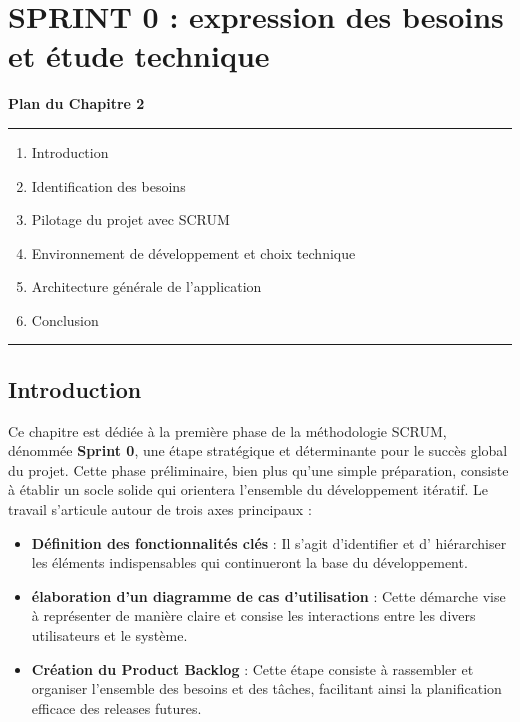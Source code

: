 \documentclass[a4paper,11pt]{report}
\begin{document}
\newpage

\chapter{SPRINT 0 : expression des besoins et étude technique }

\vspace*{2cm}

\begin{center}
    {\LARGE \textbf{Plan du Chapitre 2}}
\end{center}

\vspace{1cm}

\noindent
\textcolor{gray!70}{\rule{\textwidth}{0.4pt}}

\vspace{1cm}

\begin{enumerate}[label=\textbf{\large\arabic*.}, leftmargin=*, itemsep=1.2em]
    \item Introduction
    \item Identification des besoins
    \item Pilotage du projet avec SCRUM
    \item Environnement de développement et choix technique
    \item Architecture générale de l'application
    \item Conclusion
\end{enumerate}

\vspace{1cm}

\noindent
\textcolor{gray!70}{\rule{\textwidth}{0.4pt}}


\newpage
\setcounter{section}{0}
\section{Introduction}

Ce chapitre est dédiée à la première phase de la méthodologie SCRUM, dénommée \textbf{Sprint 0}, 
une étape stratégique et déterminante pour le succès global du projet.
\newline
\newline
Cette phase préliminaire, bien plus qu'une simple préparation, consiste à établir un socle solide qui orientera l'ensemble du développement itératif. Le travail s'articule autour de trois axes principaux : 
 \begin{itemize}
 	\item \textbf{Définition des fonctionnalités clés} : Il s'agit d'identifier et d' hiérarchiser les éléments indispensables qui continueront la base du développement.
 	\item \textbf{élaboration d'un diagramme de cas d'utilisation} : Cette démarche vise à représenter de manière claire et consise les interactions entre les divers utilisateurs et le système. 
 	\item \textbf{Création du Product Backlog } : Cette étape consiste à rassembler et organiser l'ensemble des besoins et des tâches, facilitant ainsi la planification efficace des releases futures.\\
 \end{itemize}
\end{document}
